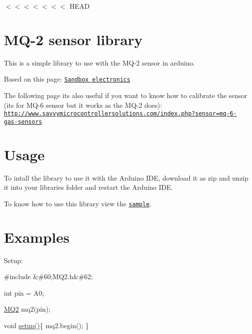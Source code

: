$<$$<$$<$$<$$<$$<$$<$ H\+E\+AD \section*{M\+Q-\/2 sensor library }

This is a simple library to use with the M\+Q-\/2 sensor in arduino.

Based on this page\+: \href{http://sandboxelectronics.com/?p=165}{\tt Sandbox electronics}

The following page it\textquotesingle{}s also useful if you want to know how to calibrate the sensor (it\textquotesingle{}s for M\+Q-\/6 sensor but it works as the M\+Q-\/2 does)\+: \href{http://www.savvymicrocontrollersolutions.com/index.php?sensor=mq-6-gas-sensors}{\tt http\+://www.\+savvymicrocontrollersolutions.\+com/index.\+php?sensor=mq-\/6-\/gas-\/sensors}

\section*{Usage }

To intall the library to use it with the Arduino I\+DE, download it as zip and unzip it into your \textquotesingle{}libraries\textquotesingle{} folder and restart the Arduino I\+DE.

To know how to use this library view the \href{/arduino_sample/arduino_sample.ino}{\tt sample}. \section*{Examples }

Setup\+: 
\begin{DoxyPre}{\ttfamily 
  #include \&\#60;MQ2.h\&\#62;}\end{DoxyPre}



\begin{DoxyPre}{\ttfamily   int pin = A0;}\end{DoxyPre}



\begin{DoxyPre}{\ttfamily   \hyperlink{class_m_q2}{MQ2} mq2(pin);}\end{DoxyPre}



\begin{DoxyPre}{\ttfamily   void \hyperlink{echo__server_8cpp_a4fc01d736fe50cf5b977f755b675f11d}{setup()}\{
    mq2.begin();
  \}
}\end{DoxyPre}


